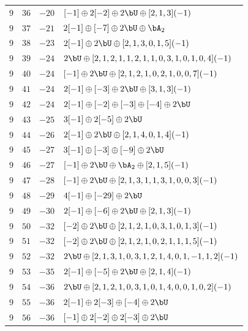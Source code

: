 \begin{center}
\begin{longtable}{llll}
 \(9\) & \(36\) & \(-20\) & \([-1] \oplus 2 [-2] \oplus 2 \bU \oplus [2, 1, 3](-1)\) \\
 \(9\) & \(37\) & \(-21\) & \(2 [-1] \oplus [-7] \oplus 2 \bU \oplus \bA_{2}\) \\
 \(9\) & \(38\) & \(-23\) & \(2 [-1] \oplus 2 \bU \oplus [2, 1, 3, 0, 1, 5](-1)\) \\
 \(9\) & \(39\) & \(-24\) & \(2 \bU \oplus [2, 1, 2, 1, 1, 2, 1, 1, 0, 3, 1, 0, 1, 0, 4](-1)\) \\
 \(9\) & \(40\) & \(-24\) & \([-1] \oplus 2 \bU \oplus [2, 1, 2, 1, 0, 2, 1, 0, 0, 7](-1)\) \\
 \(9\) & \(41\) & \(-24\) & \(2 [-1] \oplus [-3] \oplus 2 \bU \oplus [3, 1, 3](-1)\) \\
 \(9\) & \(42\) & \(-24\) & \(2 [-1] \oplus [-2] \oplus [-3] \oplus [-4] \oplus 2 \bU\) \\
 \(9\) & \(43\) & \(-25\) & \(3 [-1] \oplus 2 [-5] \oplus 2 \bU\) \\
 \(9\) & \(44\) & \(-26\) & \(2 [-1] \oplus 2 \bU \oplus [2, 1, 4, 0, 1, 4](-1)\) \\
 \(9\) & \(45\) & \(-27\) & \(3 [-1] \oplus [-3] \oplus [-9] \oplus 2 \bU\) \\
 \(9\) & \(46\) & \(-27\) & \([-1] \oplus 2 \bU \oplus \bA_{2} \oplus [2, 1, 5](-1)\) \\
 \(9\) & \(47\) & \(-28\) & \([-1] \oplus 2 \bU \oplus [2, 1, 3, 1, 1, 3, 1, 0, 0, 3](-1)\) \\
 \(9\) & \(48\) & \(-29\) & \(4 [-1] \oplus [-29] \oplus 2 \bU\) \\
 \(9\) & \(49\) & \(-30\) & \(2 [-1] \oplus [-6] \oplus 2 \bU \oplus [2, 1, 3](-1)\) \\
 \(9\) & \(50\) & \(-32\) & \([-2] \oplus 2 \bU \oplus [2, 1, 2, 1, 0, 3, 1, 0, 1, 3](-1)\) \\
 \(9\) & \(51\) & \(-32\) & \([-2] \oplus 2 \bU \oplus [2, 1, 2, 1, 0, 2, 1, 1, 1, 5](-1)\) \\
 \(9\) & \(52\) & \(-32\) & \(2 \bU \oplus [2, 1, 3, 1, 0, 3, 1, 2, 1, 4, 0, 1, -1, 1, 2](-1)\) \\
 \(9\) & \(53\) & \(-35\) & \(2 [-1] \oplus [-5] \oplus 2 \bU \oplus [2, 1, 4](-1)\) \\
 \(9\) & \(54\) & \(-36\) & \(2 \bU \oplus [2, 1, 2, 1, 0, 3, 1, 0, 1, 4, 0, 0, 1, 0, 2](-1)\) \\
 \(9\) & \(55\) & \(-36\) & \(2 [-1] \oplus 2 [-3] \oplus [-4] \oplus 2 \bU\) \\
 \(9\) & \(56\) & \(-36\) & \([-1] \oplus 2 [-2] \oplus 2 [-3] \oplus 2 \bU\) \\

\end{longtable}
\end{center}
